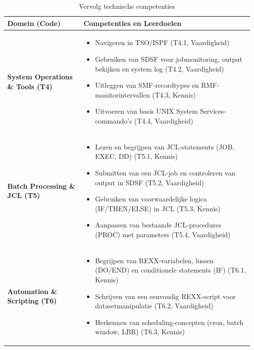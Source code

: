 \begin{table}[H]
	\centering
	\renewcommand{\arraystretch}{1.3}
	\begin{tabularx}{\textwidth}{|>{\bfseries\arraybackslash}p{3.5cm}|X|}
		\hline
		\textbf{Domein (Code)} & \textbf{Competenties en Leerdoelen} \\
		\hline
	System Operations \& Tools (T4) &
	\begin{itemize}
		\item Navigeren in TSO/ISPF (T4.1, Vaardigheid)
		\item Gebruiken van SDSF voor jobmonitoring, output bekijken en system log (T4.2, Vaardigheid)
		\item Uitleggen van SMF-recordtypes en RMF-monitorintervallen (T4.3, Kennis)
		\item Uitvoeren van basis UNIX System Services-commando's (T4.4, Vaardigheid)
	\end{itemize} \\
	\hline
	Batch Processing \& JCL (T5) &
	\begin{itemize}
		\item Lezen en begrijpen van JCL-statements (JOB, EXEC, DD) (T5.1, Kennis)
		\item Submitten van een JCL-job en controleren van output in SDSF (T5.2, Vaardigheid)
		\item Gebruiken van voorwaardelijke logica (IF/THEN/ELSE) in JCL (T5.3, Kennis)
		\item Aanpassen van bestaande JCL-procedures (PROC) met parameters (T5.4, Vaardigheid)
	\end{itemize} \\
	\hline
		Automation \& Scripting (T6) &
		\begin{itemize}
			\item Begrijpen van REXX-variabelen, lussen (DO/END) en conditionele statements (IF) (T6.1, Kennis)
			\item Schrijven van een eenvoudig REXX-script voor datasetmanipulatie (T6.2, Vaardigheid)
			\item Herkennen van scheduling-concepten (cron, batch window, LBR) (T6.3, Kennis)
		\end{itemize} \\
		\hline
	\end{tabularx}
	\caption{Vervolg technische competenties}
	\label{tab:tech-competenties2}
\end{table}


